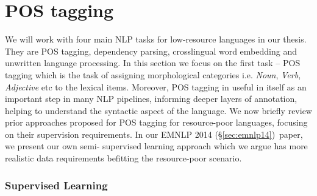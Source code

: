 \documentclass[12pt,twoside,final,hidelinks]{ltthesis}
\theoremstyle{definition}
\newcommand\emnlpiv{EMNLP 2014 (\S\ref{sec:emnlp14})}
\begin{document}
\section{POS tagging}
We will work with four main NLP tasks for low-resource languages in our thesis. They are POS tagging, dependency parsing, crosslingual word embedding and unwritten language processing. In this section we focus on the first task -- POS tagging which is the task of 
assigning morphological categories i.e. \textit{Noun}, \textit{Verb}, \textit{Adjective} etc to the lexical items. Moreover, POS tagging in useful in itself as an 
important step in many NLP pipelines, informing deeper layers of annotation, helping to understand the syntactic aspect of the language. We now briefly review prior 
approaches proposed for POS tagging for resource-poor languages, focusing on their supervision requirements. In our \emnlpiv\ paper, we present our own semi-
supervised learning approach which we argue has more realistic data requirements befitting the resource-poor scenario. 
\subsubsection{Supervised Learning}
\end{document}

